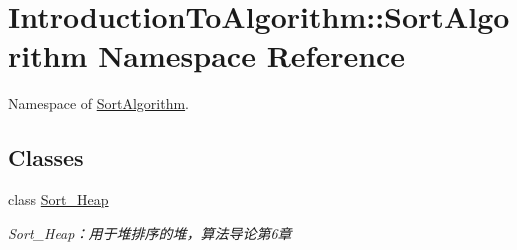 \hypertarget{namespace_introduction_to_algorithm_1_1_sort_algorithm}{}\section{Introduction\+To\+Algorithm\+:\+:Sort\+Algorithm Namespace Reference}
\label{namespace_introduction_to_algorithm_1_1_sort_algorithm}


Namespace of \hyperlink{namespace_introduction_to_algorithm_1_1_sort_algorithm}{Sort\+Algorithm}.  


\subsection*{Classes}
\begin{DoxyCompactItemize}
\item 
class \hyperlink{class_introduction_to_algorithm_1_1_sort_algorithm_1_1_sort___heap}{Sort\+\_\+\+Heap}
\begin{DoxyCompactList}\small\item\em Sort\+\_\+\+Heap：用于堆排序的堆，算法导论第6章 \end{DoxyCompactList}\end{DoxyCompactItemize}
